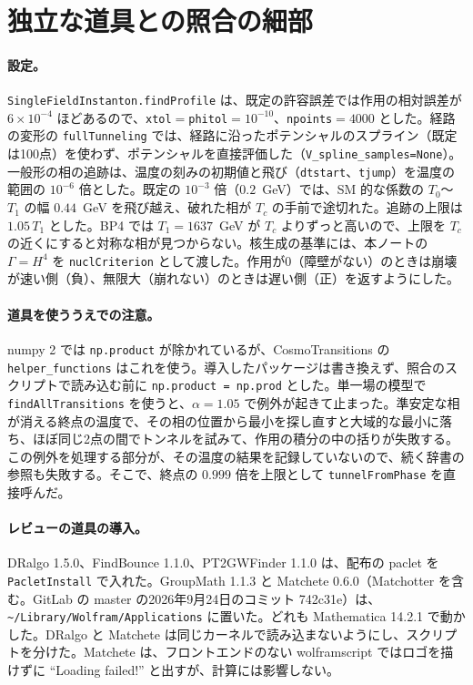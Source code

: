 \documentclass[a4paper,10pt]{ltjsarticle}
\begin{document}
\section{独立な道具との照合の細部}\label{app:ct}

\paragraph{設定。}\texttt{SingleFieldInstanton.findProfile} は、既定の許容誤差では作用の相対誤差が $6\times10^{-4}$ ほどあるので、\texttt{xtol}$=$\texttt{phitol}$=10^{-10}$、\texttt{npoints}$=4000$ とした。経路の変形の \texttt{fullTunneling} では、経路に沿ったポテンシャルのスプライン（既定は100点）を使わず、ポテンシャルを直接評価した（\texttt{V\_spline\_samples=None}）。一般形の相の追跡は、温度の刻みの初期値と飛び（\texttt{dtstart}、\texttt{tjump}）を温度の範囲の $10^{-6}$ 倍とした。既定の $10^{-3}$ 倍（$0.2$~GeV）では、SM 的な係数の $T_0$〜$T_1$ の幅 $0.44$~GeV を飛び越え、破れた相が $T_c$ の手前で途切れた。追跡の上限は $1.05\,T_1$ とした。BP4 では $T_1=1637$~GeV が $T_c$ よりずっと高いので、上限を $T_c$ の近くにすると対称な相が見つからない。核生成の基準には、本ノートの $\Gamma=H^4$ を \texttt{nuclCriterion} として渡した。作用が0（障壁がない）のときは崩壊が速い側（負）、無限大（崩れない）のときは遅い側（正）を返すようにした。

\paragraph{道具を使ううえでの注意。}numpy 2 では \texttt{np.product} が除かれているが、CosmoTransitions の \texttt{helper\_functions} はこれを使う。導入したパッケージは書き換えず、照合のスクリプトで読み込む前に \texttt{np.product = np.prod} とした。単一場の模型で \texttt{findAllTransitions} を使うと、$\alpha=1.05$ で例外が起きて止まった。準安定な相が消える終点の温度で、その相の位置から最小を探し直すと大域的な最小に落ち、ほぼ同じ2点の間でトンネルを試みて、作用の積分の中の括りが失敗する。この例外を処理する部分が、その温度の結果を記録していないので、続く辞書の参照も失敗する。そこで、終点の $0.999$ 倍を上限として \texttt{tunnelFromPhase} を直接呼んだ。

\paragraph{レビューの道具の導入。}DRalgo 1.5.0、FindBounce 1.1.0、PT2GWFinder 1.1.0 は、配布の paclet を \texttt{PacletInstall} で入れた。GroupMath 1.1.3 と Matchete 0.6.0（Matchotter を含む。GitLab の master の2026年9月24日のコミット 742c31e）は、\texttt{\textasciitilde/Library/Wolfram/Applications} に置いた。どれも Mathematica 14.2.1 で動かした。DRalgo と Matchete は同じカーネルで読み込まないようにし、スクリプトを分けた。Matchete は、フロントエンドのない wolframscript ではロゴを描けずに ``Loading failed!'' と出すが、計算には影響しない。
\end{document}

